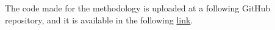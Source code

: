 \clearpage
{}
\renewcommand{\thesection}{\Alph{section}}
\renewcommand{\theHsection}{appendix.\thesection} %
\label{appendix:github}
The code made for the methodology is uploaded at a following GitHub repository, and it is available in the following \href{https://github.com/Kevin-Rishor/Analysis-of-MHD-oscillations-at-Heliotron-J-with-Python-}{link}.
